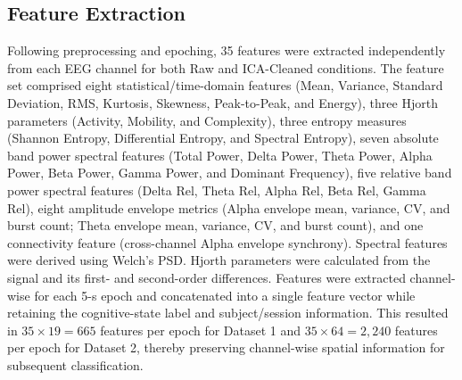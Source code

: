 \documentclass[conference]{IEEEtran}
\begin{document}
\subsection{Feature Extraction}
Following preprocessing and epoching, 35 features were extracted independently from each EEG channel for both Raw and ICA-Cleaned conditions. The feature set comprised eight statistical/time-domain features (Mean, Variance, Standard Deviation, RMS, Kurtosis, Skewness, Peak-to-Peak, and Energy), three Hjorth parameters (Activity, Mobility, and Complexity), three entropy measures (Shannon Entropy, Differential Entropy, and Spectral Entropy), seven absolute band power spectral features (Total Power, Delta Power, Theta Power, Alpha Power, Beta Power, Gamma Power, and Dominant Frequency), five relative band power spectral features (Delta Rel, Theta Rel, Alpha Rel, Beta Rel, Gamma Rel), eight amplitude envelope metrics (Alpha envelope mean, variance, CV, and burst count; Theta envelope mean, variance, CV, and burst count), and one connectivity feature (cross-channel Alpha envelope synchrony).
Spectral features were derived using Welch's PSD. Hjorth parameters were calculated from the signal and its first- and second-order differences.
Features were extracted channel-wise for each 5-s epoch and concatenated into a single feature vector while retaining the cognitive-state label and subject/session information. This resulted in $35\times19=665$ features per epoch for Dataset 1 and $35\times64=2,240$ features per epoch for Dataset 2, thereby preserving channel-wise spatial information for subsequent classification.
\end{document}
